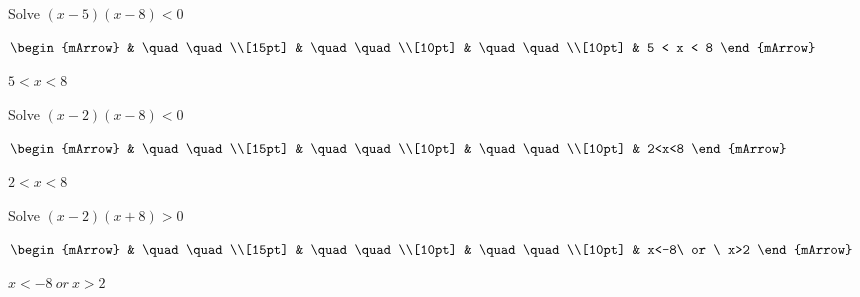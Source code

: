 \clearpage
\begin{mtask}[resume]		 
   \task \begin{exercise} Solve $(x-5)(x-8) < 0$
           \begin{envSolution}
             $\begin{mArrow} 
			       & \quad \quad              \\[15pt]
                   & \quad \quad              \\[10pt]
		   		   & \quad \quad              \\[10pt]
				   & 5 < x < 8 
              \end{mArrow}$
            \begin{shortsolution}  
			     $5 < x < 8$
			\end{shortsolution}				 
           \end{envSolution}
         \end{exercise}
   \task \begin{exercise} Solve $(x-2)(x-8) < 0$
           \begin{envSolution}
             $\begin{mArrow} 
			       & \quad \quad              \\[15pt]
                   & \quad \quad              \\[10pt]
		   		   & \quad \quad              \\[10pt]
				   & 2<x<8 
              \end{mArrow}$
            \begin{shortsolution}  
			     $2<x<8$
			\end{shortsolution}				 
           \end{envSolution}
         \end{exercise}
   \task \begin{exercise} Solve $(x-2)(x+8) > 0$
           \begin{envSolution}
             $\begin{mArrow} 
			       & \quad \quad              \\[15pt]
                   & \quad \quad              \\[10pt]
		   		   & \quad \quad              \\[10pt]
				   & x<-8\ or \ x>2 
              \end{mArrow}$
            \begin{shortsolution}  
			     $x<-8\ or \ x>2$
			\end{shortsolution}				 
           \end{envSolution}

\end{exercise}
\end{mtask}
